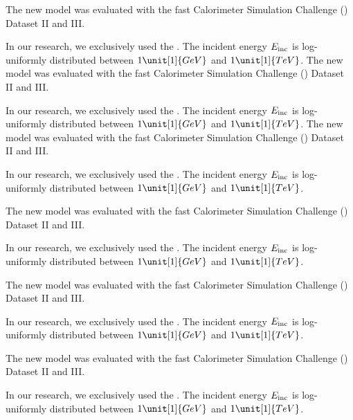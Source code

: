 The new model was evaluated with the fast Calorimeter Simulation Challenge (\challenge) Dataset II and III.

In our research, we exclusively used the \challenge \parencite{CaloChallenge}. The incident energy $E_{\rm inc}$ is log-uniformly distributed between $1 \unit[1]{GeV}$ and $1 \unit[1]{TeV}$.
The new model was evaluated with the fast Calorimeter Simulation Challenge (\challenge) Dataset II and III.

In our research, we exclusively used the \challenge \parencite{CaloChallenge}. The incident energy $E_{\rm inc}$ is log-uniformly distributed between $1 \unit[1]{GeV}$ and $1 \unit[1]{TeV}$.
The new model was evaluated with the fast Calorimeter Simulation Challenge (\challenge) Dataset II and III.

In our research, we exclusively used the \challenge \parencite{CaloChallenge}. The incident energy $E_{\rm inc}$ is log-uniformly distributed between $1 \unit[1]{GeV}$ and $1 \unit[1]{TeV}$.
\begin{frame}[t]
The new model was evaluated with the fast Calorimeter Simulation Challenge (\challenge) Dataset II and III.

In our research, we exclusively used the \challenge \parencite{CaloChallenge}. The incident energy $E_{\rm inc}$ is log-uniformly distributed between $1 \unit[1]{GeV}$ and $1 \unit[1]{TeV}$.
\end{frame}

\begin{frame}[t]
The new model was evaluated with the fast Calorimeter Simulation Challenge (\challenge) Dataset II and III.

In our research, we exclusively used the \challenge \parencite{CaloChallenge}. The incident energy $E_{\rm inc}$ is log-uniformly distributed between $1 \unit[1]{GeV}$ and $1 \unit[1]{TeV}$.
\end{frame}

\begin{frame}[t]
The new model was evaluated with the fast Calorimeter Simulation Challenge (\challenge) Dataset II and III.

In our research, we exclusively used the \challenge \parencite{CaloChallenge}. The incident energy $E_{\rm inc}$ is log-uniformly distributed between $1 \unit[1]{GeV}$ and $1 \unit[1]{TeV}$.
\end{frame}

